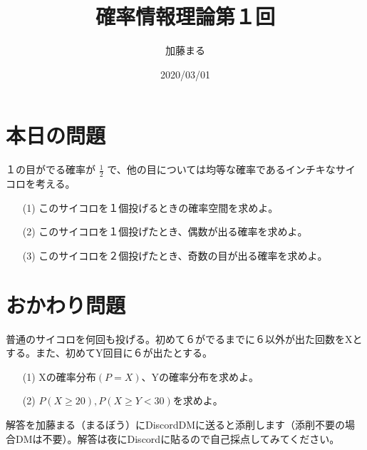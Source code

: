 \documentclass[a4j,uplatex]{jsarticle}
\title{確率情報理論第１回}
\author{加藤まる}
\date{2020/03/01}
\begin{document}
\maketitle
\section*{本日の問題}

１の目がでる確率が $\frac{1}{2}$ で、他の目については均等な確率であるインチキなサイコロを考える。
\begin{itemize}
  \item[(1)] このサイコロを１個投げるときの確率空間を求めよ。 
  \item[(2)] このサイコロを１個投げたとき、偶数が出る確率を求めよ。
  \item[(3)] このサイコロを２個投げたとき、奇数の目が出る確率を求めよ。 
\end{itemize}

\section*{おかわり問題}
普通のサイコロを何回も投げる。初めて６がでるまでに６以外が出た回数をXとする。また、初めてY回目に６が出たとする。
\begin{itemize}
  \item[(1)] Xの確率分布$(P=X)$、Yの確率分布を求めよ。
  \item[(2)] $ P(X\ge20) , P(X\ge Y<30) $を求めよ。 
\end{itemize}

解答を加藤まる（まるぼう）にDiscordDMに送ると添削します（添削不要の場合DMは不要）。解答は夜にDiscordに貼るので自己採点してみてください。
\end{document}
